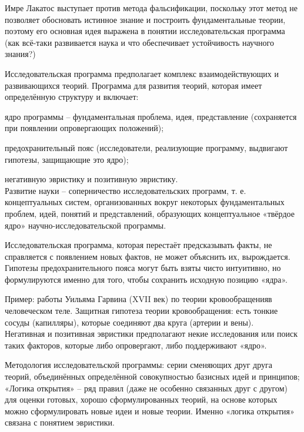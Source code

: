 \documentclass[exam_answers.tex]{subfiles}
\begin{document}
\renewcommand{\baselinestretch}{\blch}

Имре Лакатос выступает против метода фальсификации, поскольку этот метод не позволяет обосновать истинное знание и построить фундаментальные теории, поэтому его основная идея выражена в понятии исследовательская программа (как всё-таки развивается наука и что обеспечивает устойчивость научного знания?)

Исследовательская программа предполагает комплекс взаимодействующих и развивающихся теорий. Программа для развития теорий, которая имеет определённую структуру и включает:

ядро программы – фундаментальная проблема, идея, представление (сохраняется при появлении опровергающих положений);

предохранительный пояс (исследователи, реализующие программу, выдвигают гипотезы, защищающие это ядро);

негативную эвристику и позитивную эвристику.
\\

Развитие науки – соперничество исследовательских программ, т. е. концептуальных систем, организованных вокруг некоторых фундаментальных проблем, идей, понятий и представлений, образующих концептуальное «твёрдое ядро» научно-исследовательской программы.

Исследовательская программа, которая перестаёт предсказывать факты, не справляется с появлением новых фактов, не может объяснить их, вырождается.
\\

Гипотезы предохранительного пояса могут быть взяты чисто интуитивно, но формулируются именно для того, чтобы сохранить исходную позицию «ядра».

Пример: работы Уильяма Гарвина (XVII век) по теории кровообращенияв человеческом теле. Защитная гипотеза теории кровообращения: есть тонкие сосуды (капилляры), которые соединяют два круга (артерии и вены).
\\

Негативная и позитивная эвристики предполагают некие исследования или поиск таких факторов, которые либо опровергают, либо поддерживают «ядро».

Методология исследовательской программы: серии сменяющих друг друга теорий, объединённых определённой совокупностью базисных идей и принципов; «Логика открытия» -- ряд правил (даже не особенно связанных друг с другом) для оценки готовых, хорошо сформулированных теорий, на основе которых можно сформулировать новые идеи и новые теории. Именно «логика открытия» связана с понятием эвристики.
\\
\end{document}
